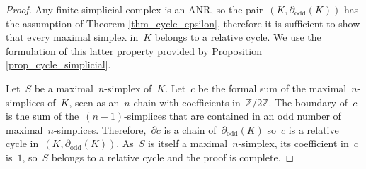 \documentclass[english,11pt]{article}
\theoremstyle{plain}
\newtheorem{lemma}{Lemma}[section]
\theoremstyle{remark}
\theoremstyle{definition}
\newcommand{\odd}[1]{\partial_\mathrm{odd}(#1)}
\newcommand{\Z}{\mathbb{Z}}
\newcommand{\C}[1]{\mathsf{C}(#1)}%
\begin{document}
\begin{proof}
Any finite simplicial complex is an ANR, so the pair~$(K,\odd K)$ has the assumption of Theorem \ref{thm_cycle_epsilon}, therefore it is sufficient to show that every maximal simplex in~$K$ belongs to a relative cycle. We use the formulation of this latter property provided by Proposition \ref{prop_cycle_simplicial}.

Let~$S$ be a maximal~$n$-simplex of~$K$. Let~$c$ be the formal sum of the maximal~$n$-simplices of~$K$, seen as an~$n$-chain with coefficients in~$\Z/2\Z$. The boundary of~$c$ is the sum of the~$(n-1)$-simplices that are contained in an odd number of maximal~$n$-simplices. Therefore,~$\partial c$ is a chain of~$\odd K$ so~$c$ is a relative cycle in~$(K,\odd K)$. As~$S$ is itself a maximal~$n$-simplex, its coefficient in~$c$ is~$1$, so~$S$ belongs to a relative cycle and the proof is complete.
\end{proof}
%
%
%
%
%
%
%
\end{document}
